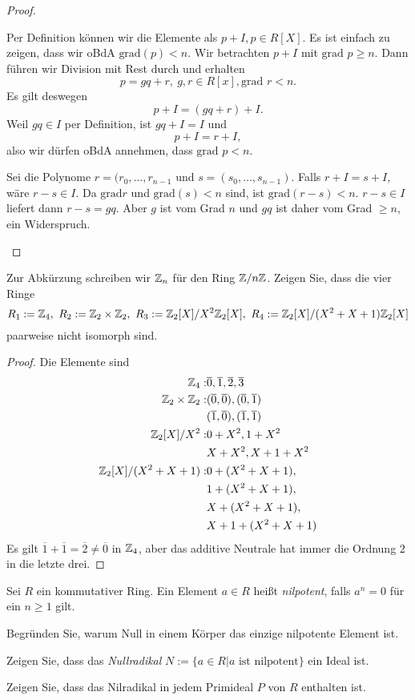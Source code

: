 \begin{proof}
	\begin{parts}
	\item Per Definition können wir die Elemente als $p+I,p\in R[X]$. Es ist einfach zu zeigen, dass wir oBdA $\text{grad}(p)<n$. Wir betrachten $p+I$ mit $\text{grad }p\ge n$. Dann führen wir Division mit Rest durch und erhalten
		\[
			p=gq+r,~g,r\in R[x],\text{grad }r<n
		.\] 
		Es gilt deswegen
		\[
		p+I=(gq+r)+I
		.\] 
		Weil $gq\in I$ per Definition, ist $gq+I=I$ und
		\[
		p+I=r+I
	,\]
	also wir dürfen oBdA annehmen, dass $\text{grad }p<n$.
\item Sei die Polynome $r=(r_0,\dots, r_{n-1}$ und $s=(s_0,\dots, s_{n-1})$. Falls $r+I=s+I$, wäre $r-s\in I$. Da $\text{grad}r$ und $\text{grad}(s)<n$ sind, ist $\text{grad}(r-s)<n$. $r-s\in I$ liefert dann $r-s=gq$. Aber $g$ ist vom Grad $n$ und $gq$ ist daher vom Grad $\ge n$, ein Widerspruch.\qedhere
	\end{parts}
\end{proof}
\begin{Problem}
	Zur Abkürzung schreiben wir $\mathbb{Z}_n$ f\"{u}r den Ring $\mathbb{Z} / n\mathbb{Z}$. Zeigen Sie, dass die vier Ringe
	\[
		R_1:=\mathbb{Z}_4,~R_2:=\mathbb{Z}_2\times \mathbb{Z}_2,~R_3:=\mathbb{Z}_2[X] / X^2 \mathbb{Z}_2[X],~R_4:=\mathbb{Z}_2[X] / (X^2+X+1)\mathbb{Z}_2[X]
	\]
	paarweise nicht isomorph sind.
\end{Problem}
\begin{proof}
	Die Elemente sind
	\begin{align*}
		\mathbb{Z}_4:&\overline{0},\overline{1},\overline{2},\overline{3}\\
		\mathbb{Z}_2\times \mathbb{Z}_2:&(\overline{0},\overline{0}),(\overline{0},\overline{1})\\
				&(\overline{1},\overline{0}),(\overline{1},\overline{1})\\
		\mathbb{Z}_2[X] / X^2:&0+X^2,1+X^2\\
			      &X+X^2,X+1+X^2\\
		\mathbb{Z}_2[X] / (X^2+X+1):&0+(X^2+X+1),\\
				    &1+(X^2+X+1),\\
				    &X+(X^2+X+1),\\
				    &X+1+(X^2+X+1)
	\end{align*}
	Es gilt $\overline{1}+\overline{1}=\overline{2}\neq \overline{0}$ in $\mathbb{Z}_4$, aber das additive Neutrale hat immer die Ordnung $2$ in die letzte drei.
\end{proof}
\begin{Problem}
	Sei $R$ ein kommutativer Ring. Ein Element $a\in R$ heißt \emph{nilpotent}, falls $a^n=0$ f\"{u}r ein $n\ge 1$ gilt.
	\begin{parts}
	\item Begründen Sie, warum Null in einem Körper das einzige nilpotente Element ist.
	\item Zeigen Sie, dass das \emph{Nullradikal} $N:=\{a\in R|a\text{ ist nilpotent}\} $ ein Ideal ist.
	\item Zeigen Sie, dass das Nilradikal in jedem Primideal $P$ von $R$ enthalten ist.
	\end{parts}
\end{Problem}

